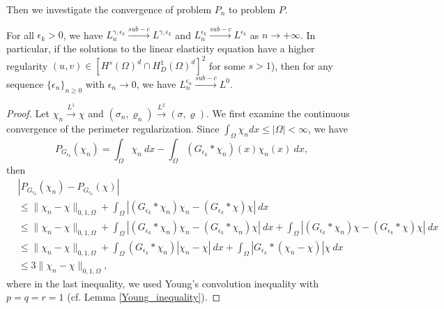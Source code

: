 \documentclass{amsart}
\begin{document}
Then we investigate the convergence of problem $P_n$ to problem $P$.
\begin{theorem}\label{P_n_star_P}
     For all $\epsilon_k> 0$, we have $L_n^{\gamma,{\epsilon_k}}\stackrel{sub-c}{\longrightarrow} L^{\gamma,{\epsilon_k}}$ and  $L_n^{\epsilon_k}\stackrel{sub-c}{\longrightarrow} L^{\epsilon_k}$ as $n\rightarrow +\infty$. In particular, if the solutions to the linear elasticity equation have a higher regularity \((u, v) \in [H^s(\Omega)^d\cap H_D^1(\Omega)^d]^2\) for some \(s>1\)), then for any sequence \(\{\epsilon_n\}_{n \geq 0}\) with \(\epsilon_n \to 0\), we have \(L_n^{\epsilon_n} \stackrel{sub-c}{\longrightarrow}  L^0\).
\end{theorem}
\begin{proof}
    Let $\chi_n\stackrel{L^1}{\longrightarrow}\chi$ and $(\sigma_n,\varrho_n)\stackrel{L^2}{\longrightarrow}(\sigma,\varrho)$. We first examine the continuous convergence of the perimeter regularization.
    Since $\int_\Omega\chi_n dx\leq |\Omega|<\infty$, we have \cite[eq. (1.2), Page 236]{Maz} 
    \begin{equation}
        P_{G_{\epsilon_k}}(\chi_n)=\int_\Omega \chi_n\ dx-\int_\Omega (G_{\epsilon_k}*\chi_n)(x)\chi_n(x)\ dx, 
    \end{equation}
    then
    \begin{align*}
        &|P_{G_{\epsilon_k}}(\chi_n) - P_{G_{\epsilon_k}}(\chi)|\\
        &\leq \|\chi_n-\chi\|_{0,1,\Omega}+\int_\Omega|(G_{\epsilon_k}*\chi_n)\chi_n-(G_{\epsilon_k}*\chi)\chi|\ dx\\
        &\leq \|\chi_n-\chi\|_{0,1,\Omega}+\int_\Omega|(G_{\epsilon_k}*\chi_n)\chi_n-(G_{\epsilon_k}*\chi_n)\chi|\ dx+\int_\Omega|(G_{\epsilon_k}*\chi_n)\chi-(G_{\epsilon_k}*\chi)\chi|\ dx\\
        &\leq \|\chi_n-\chi\|_{0,1,\Omega}+\int_\Omega(G_{\epsilon_k}*\chi_n)|\chi_n-\chi|\ dx+\int_\Omega|G_{\epsilon_k}*(\chi_n-\chi)|\chi\ dx\\
        &\leq 3\|\chi_n-\chi\|_{0,1,\Omega},
    \end{align*}
   where in the last inequality, we used Young's convolution inequality with $p=q=r=1$ (cf. Lemma \ref{Young_inequality}).
    

\end{proof}
\end{document}
